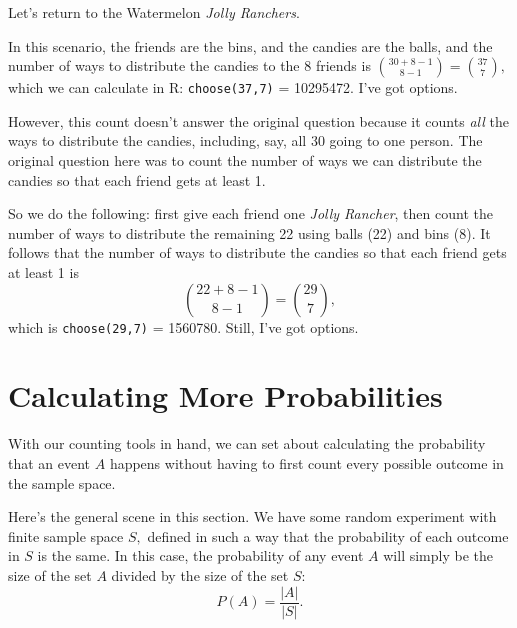\documentclass[
]{book}
\theoremstyle{definition}
\theoremstyle{definition}
\theoremstyle{definition}
\theoremstyle{definition}
\theoremstyle{remark}
\begin{document}
Let's return to the Watermelon \emph{Jolly Ranchers}.

In this scenario, the friends are the bins, and the candies are the balls, and the number of ways to distribute the candies to the 8 friends is \(\displaystyle \binom{30+8-1}{8-1}=\binom{37}{7},\)
which we can calculate in R: \texttt{choose(37,7)} = 10295472. I've got options.

However, this count doesn't answer the original question because it counts \emph{all} the ways to distribute the candies, including, say, all 30 going to one person. The original question here was to count the number of ways we can distribute the candies so that each friend gets at least 1.

So we do the following: first give each friend one \emph{Jolly Rancher}, then count the number of ways to distribute the remaining 22 using balls (22) and bins (8). It follows that the number of ways to distribute the candies so that each friend gets at least 1 is
\[\binom{22+8-1}{8-1} = \binom{29}{7},\]
which is \texttt{choose(29,7)} = 1560780. Still, I've got options.

\section{Calculating More Probabilities}\label{prob-with-counting-tools}

With our counting tools in hand, we can set about calculating the probability that an event \(A\) happens without having to first count every possible outcome in the sample space.

Here's the general scene in this section. We have some random experiment with finite sample space \(S,\) defined in such a way that the probability of each outcome in \(S\) is the same. In this case, the probability of any event \(A\) will simply be the size of the set \(A\) divided by the size of the set \(S\):
\[P(A) = \frac{|A|}{|S|}.\]
\end{document}
